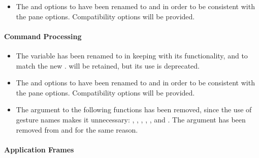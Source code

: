\begin{itemize}
\item The  and  options to
 have been renamed to  and  in
order to be consistent with the pane options.  Compatibility options will be
provided.
\end{itemize}


\paragraph {Command Processing}

\begin{itemize}
\item The variable  has been renamed to
 in keeping with its functionality, and to
match the new .   will
be retained, but its use is deprecated.

\item The  and  options to
 have been renamed to  and
 in order to be consistent with the pane options.  Compatibility
options will be provided.

\item The  argument to the following functions has been removed, since
the use of gesture names makes it unnecessary:  ,
, ,
, , and
.  The  argument has been
removed from  and  for the
same reason.
\end{itemize}


\paragraph {Application Frames}

